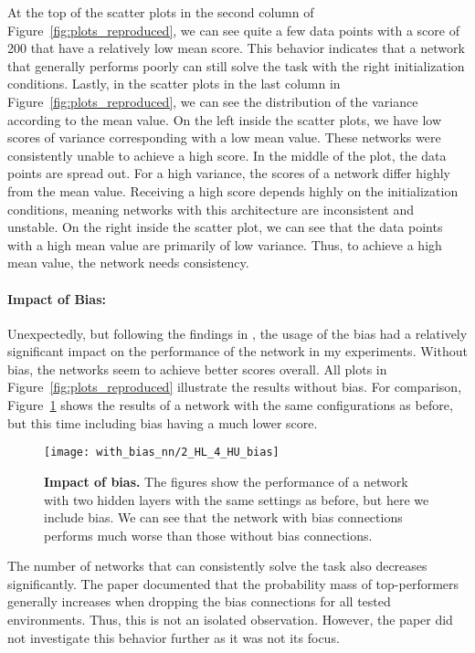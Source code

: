 At the top of the scatter plots in the second column of Figure~\ref{fig:plots_reproduced}, we can see quite a few data points with a score of 200 that have a relatively low mean score. This behavior indicates that a network that generally performs poorly can still solve the task with the right initialization conditions. Lastly, in the scatter plots in the last column in Figure~\ref{fig:plots_reproduced}, we can see the distribution of the variance according to the mean value. On the left inside the scatter plots, we have low scores of variance corresponding with a low mean value. These networks were consistently unable to achieve a high score. In the middle of the plot, the data points are spread out. For a high variance, the scores of a network differ highly from the mean value. Receiving a high score depends highly on the initialization conditions, meaning networks with this architecture are inconsistent and unstable. On the right inside the scatter plot, we can see that the data points with a high mean value are primarily of low variance. Thus, to achieve a high mean value, the network needs consistency.

\paragraph*{Impact of Bias:} Unexpectedly, but following the findings in \cite{oller_analyzing_2020}, the usage of the bias had a relatively significant impact on the performance of the network in my experiments. Without bias, the networks seem to achieve better scores overall. All plots in Figure~\ref{fig:plots_reproduced} illustrate the results without bias. For comparison, Figure~\ref{fig:comparison_bias} shows the results of a network with the same configurations as before, but this time including bias having a much lower score.
\begin{figure}[ht]
\centering
\texttt{[image: with\_bias\_nn/2\_HL\_4\_HU\_bias]}
\caption[Impact of bias]{
  \textbf{Impact of bias.}
  The figures show the performance of a network with two hidden layers with the same settings as before, but here we include bias. We can see that the network with bias connections performs much worse than those without bias connections.
}
\label{fig:comparison_bias}
\end{figure}
The number of networks that can consistently solve the task also decreases significantly. The paper documented that the probability mass of top-performers generally increases when dropping the bias connections for all tested environments. Thus, this is not an isolated observation. However, the paper did not investigate this behavior further as it was not its focus.

